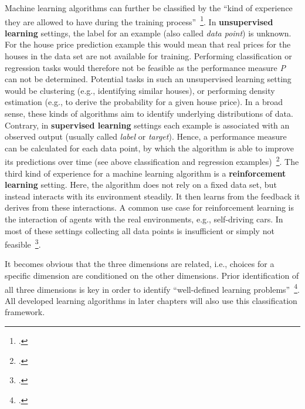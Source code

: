 Machine learning algorithms can further be classified by the ``kind of experience
they are allowed to have during the training process''~\footcite[104]{Goodfellow2016}.
In \textbf{unsupervised learning} settings, the label for an example (also called
\textit{data point}) is unknown. For the house price prediction example this
would mean that real prices for the houses in the data set are not
available for training. Performing classification or regression tasks would
therefore not be feasible as the performance measure \textit{P} can not be
determined. Potential tasks in such an unsupervised learning setting would be
clustering (e.g., identifying similar houses), or performing density estimation
(e.g., to derive the probability for a given house price). In a broad sense, these
kinds of algorithms aim to identify underlying distributions of data. Contrary, in 
\textbf{supervised learning} settings each example is associated with an 
observed output (usually called \textit{label} or \textit{target}). Hence, a
performance measure can be calculated for each data point, by which the
algorithm is able to improve its predictions over time (see above classification
and regression examples)~\footcite{Goodfellow2016, Bishop2006}. The third kind of
experience for a machine learning algorithm is a \textbf{reinforcement learning}
setting. Here, the algorithm does not rely on a fixed data set, but instead 
interacts with its environment steadily. It then learns from the feedback it
derives from these interactions. A common use case for reinforcement
learning is the interaction of agents with the real environments, e.g.,
self-driving cars. In most of these settings collecting all data points is
insufficient or simply not feasible~\footcite{Sutton1998}.

It becomes obvious that the three dimensions are related, i.e., choices for a
specific dimension are conditioned on the other dimensions. Prior identification 
of all three dimensions is key in order to identify 
``well-defined learning problems''~\footcite[2--3]{Mitchell1997}. All developed 
learning algorithms in later chapters will also use this classification 
framework. 
